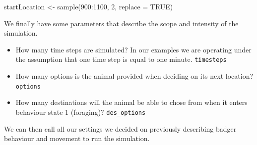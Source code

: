 \documentclass[10pt,a4paper]{article}
\newenvironment{Shaded}{}{}
\newcommand{\AttributeTok}[1]{#1}
\newcommand{\ConstantTok}[1]{#1}
\newcommand{\DecValTok}[1]{#1}
\newcommand{\FunctionTok}[1]{#1}
\newcommand{\NormalTok}[1]{#1}
\newcommand{\OtherTok}[1]{#1}
\newcommand{\SpecialCharTok}[1]{#1}
\providecommand{\tightlist}{%
  \setlength{\itemsep}{0pt}\setlength{\parskip}{0pt}}
\begin{document}
\begin{Shaded}
\begin{Highlighting}[]
\NormalTok{startLocation }\OtherTok{\textless{}{-}} \FunctionTok{sample}\NormalTok{(}\DecValTok{900}\SpecialCharTok{:}\DecValTok{1100}\NormalTok{, }\DecValTok{2}\NormalTok{, }\AttributeTok{replace =} \ConstantTok{TRUE}\NormalTok{)}
\end{Highlighting}
\end{Shaded}

We finally have some parameters that describe the scope and intensity of the simulation.

\begin{itemize}
\tightlist
\item
  How many time steps are simulated? In our examples we are operating under the assumption that one time step is equal to one minute.
  \texttt{timesteps}
\item
  How many options is the animal provided when deciding on its next location?
  \texttt{options}
\item
  How many destinations will the animal be able to chose from when it enters behaviour state 1 (foraging)?
  \texttt{des\_options}
\end{itemize}

We can then call all our settings we decided on previously describing badger behaviour and movement to run the simulation.
\end{document}
